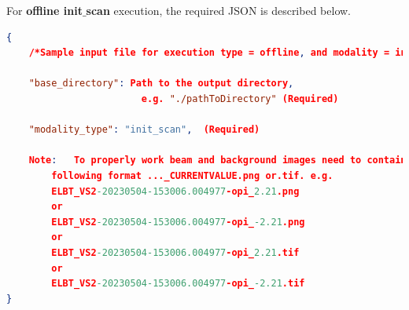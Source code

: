 \documentclass{article}
\begin{document}
\newpage
For \textbf{offline  init$\_$scan} execution, the required JSON is described below.
\begin{lstlisting}[language=json,firstnumber=0]
{
    /*Sample input file for execution type = offline, and modality = init_scan */
    
    "base_directory": Path to the output directory, 
                        e.g. "./pathToDirectory" (Required)
    
    "modality_type": "init_scan",  (Required)

    Note:   To properly work beam and background images need to contain the solenoid current in their names in the 
        following format ..._CURRENTVALUE.png or.tif. e.g.
        ELBT_VS2-20230504-153006.004977-opi_2.21.png 
        or 
        ELBT_VS2-20230504-153006.004977-opi_-2.21.png
        or 
        ELBT_VS2-20230504-153006.004977-opi_2.21.tif
        or 
        ELBT_VS2-20230504-153006.004977-opi_-2.21.tif
}
\end{lstlisting}
\end{document}
